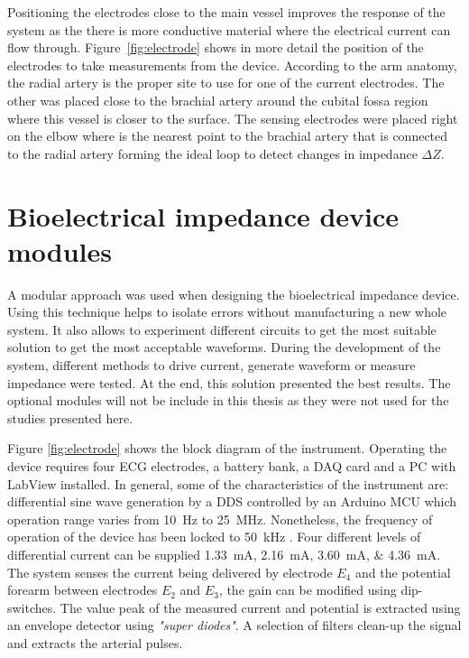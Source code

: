 Positioning the electrodes close to the main vessel improves the response of the system as the there is more conductive material where the electrical current can flow through. Figure~\ref{fig:electrode} shows in more detail the position of the electrodes to take measurements from the device. According to the arm anatomy, the radial artery is the proper site to use for one of the current electrodes. The other was placed close to the brachial artery around the cubital fossa region where this vessel is closer to the surface. The sensing electrodes were placed right on the elbow where is the nearest point to the brachial artery that is connected to the radial artery forming the ideal loop to detect changes in impedance $\Delta Z$.  

\section{Bioelectrical impedance device modules}
A modular approach was used when designing the bioelectrical impedance device. Using this technique helps to isolate errors without manufacturing a new whole system. It also allows to experiment different circuits to get the most suitable solution to get the most acceptable waveforms. During the development of the system, different methods to drive current, generate waveform or measure impedance were tested. At the end, this solution presented the best results. The optional modules will not be include in this thesis as they were not used for the studies presented here.

Figure \ref{fig:electrode} shows the block diagram of the instrument. Operating the device requires four ECG electrodes, a battery bank, a DAQ card and a PC with LabView \cite{LabView:2016} installed. In general, some of the characteristics of the instrument are: differential sine wave generation by a DDS controlled by an Arduino MCU which operation range varies from \SI{10}{\Hz} to \SI{25}{\MHz}. Nonetheless, the frequency of operation of the device has been locked to \SI{50}{\kHz} . Four different levels of differential current can be supplied \SIlist{1.33;2.16;3.60;4.36}{\mA}. The system senses the current being delivered by electrode $E_4$ and the potential forearm between electrodes $E_2$ and $E_3$, the gain can be modified using dip-switches. The value peak of the measured current and potential is extracted using an envelope detector using \textit{"super diodes"}. A selection of filters clean-up the signal and extracts the arterial pulses.

